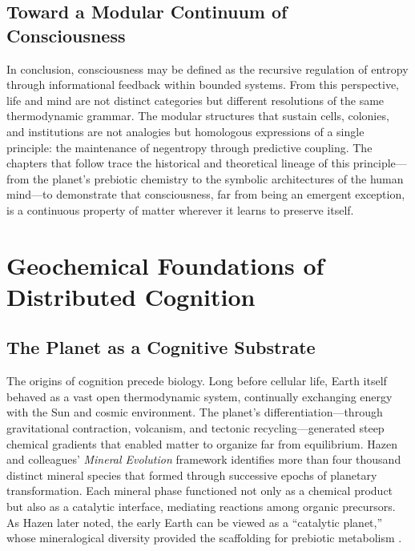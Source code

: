 \documentclass[11pt,a4paper]{article}
\begin{document}
\subsection{Toward a Modular Continuum of Consciousness}

In conclusion, consciousness may be defined as the recursive regulation of entropy through informational feedback within bounded systems.  From this perspective, life and mind are not distinct categories but different resolutions of the same thermodynamic grammar.  The modular structures that sustain cells, colonies, and institutions are not analogies but homologous expressions of a single principle: the maintenance of negentropy through predictive coupling.  The chapters that follow trace the historical and theoretical lineage of this principle---from the planet’s prebiotic chemistry to the symbolic architectures of the human mind---to demonstrate that consciousness, far from being an emergent exception, is a continuous property of matter wherever it learns to preserve itself.


\section{Geochemical Foundations of Distributed Cognition}
\label{sec:geochemical}

\subsection{The Planet as a Cognitive Substrate}

The origins of cognition precede biology.  Long before cellular life, Earth itself behaved as a vast open thermodynamic system, continually exchanging energy with the Sun and cosmic environment.  The planet’s differentiation---through gravitational contraction, volcanism, and tectonic recycling---generated steep chemical gradients that enabled matter to organize far from equilibrium.  Hazen and colleagues’ \emph{Mineral Evolution} framework \citep{Hazen2008MineralEvolution} identifies more than four thousand distinct mineral species that formed through successive epochs of planetary transformation.  Each mineral phase functioned not only as a chemical product but also as a catalytic interface, mediating reactions among organic precursors.  As Hazen later noted, the early Earth can be viewed as a “catalytic planet,” whose mineralogical diversity provided the scaffolding for prebiotic metabolism \citep{Hazen2010EvolutionMinerals}.
\end{document}
